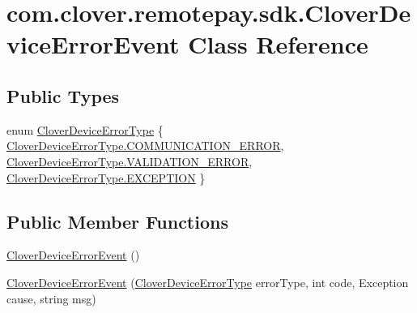 \hypertarget{classcom_1_1clover_1_1remotepay_1_1sdk_1_1_clover_device_error_event}{}\section{com.\+clover.\+remotepay.\+sdk.\+Clover\+Device\+Error\+Event Class Reference}
\label{classcom_1_1clover_1_1remotepay_1_1sdk_1_1_clover_device_error_event}
\subsection*{Public Types}
\begin{DoxyCompactItemize}
\item 
enum \hyperlink{classcom_1_1clover_1_1remotepay_1_1sdk_1_1_clover_device_error_event_a02daf08e6df844b1e25144e6e9f5e422}{Clover\+Device\+Error\+Type} \{ \hyperlink{classcom_1_1clover_1_1remotepay_1_1sdk_1_1_clover_device_error_event_a02daf08e6df844b1e25144e6e9f5e422aca3a06257167acb5cd86e22cb0289115}{Clover\+Device\+Error\+Type.\+C\+O\+M\+M\+U\+N\+I\+C\+A\+T\+I\+O\+N\+\_\+\+E\+R\+R\+OR}, 
\hyperlink{classcom_1_1clover_1_1remotepay_1_1sdk_1_1_clover_device_error_event_a02daf08e6df844b1e25144e6e9f5e422a2fa475b43d744661c4c9e1dbd9840278}{Clover\+Device\+Error\+Type.\+V\+A\+L\+I\+D\+A\+T\+I\+O\+N\+\_\+\+E\+R\+R\+OR}, 
\hyperlink{classcom_1_1clover_1_1remotepay_1_1sdk_1_1_clover_device_error_event_a02daf08e6df844b1e25144e6e9f5e422acccc265b14c17af799a1834f4fbbe7cf}{Clover\+Device\+Error\+Type.\+E\+X\+C\+E\+P\+T\+I\+ON}
 \}
\end{DoxyCompactItemize}
\subsection*{Public Member Functions}
\begin{DoxyCompactItemize}
\item 
\hyperlink{classcom_1_1clover_1_1remotepay_1_1sdk_1_1_clover_device_error_event_ad453878a0f639acaefedf5e6786cdd02}{Clover\+Device\+Error\+Event} ()
\item 
\hyperlink{classcom_1_1clover_1_1remotepay_1_1sdk_1_1_clover_device_error_event_adce08890cca53c7f126586afdc07c550}{Clover\+Device\+Error\+Event} (\hyperlink{classcom_1_1clover_1_1remotepay_1_1sdk_1_1_clover_device_error_event_a02daf08e6df844b1e25144e6e9f5e422}{Clover\+Device\+Error\+Type} error\+Type, int code, Exception cause, string msg)
\end{DoxyCompactItemize}
